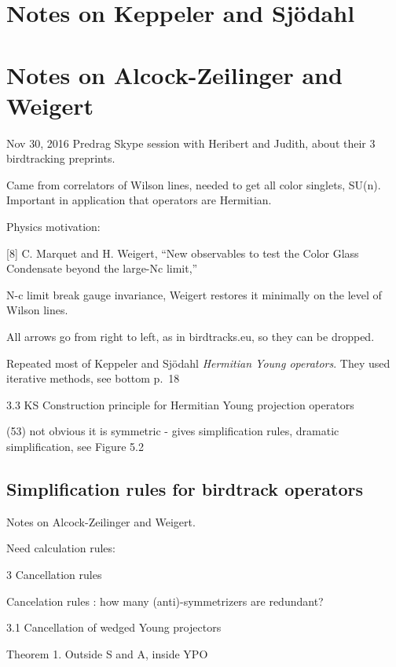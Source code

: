 \section{Notes on Keppeler and Sj{\"o}dahl}
\label{s-AlcZei16}



\section{Notes on Alcock-Zeilinger and Weigert}
\label{s-AlcZei16}

Nov 30, 2016 Predrag Skype session with
Heribert and Judith, about their 3 birdtracking preprints.

Came from correlators of Wilson lines, needed to get all color singlets, SU(n).
Important in application that operators are Hermitian.

Physics motivation:

[8] C. Marquet and H. Weigert, ``New observables to test the Color Glass Condensate beyond the large-Nc
limit,''

N-c limit break gauge invariance, Weigert restores it minimally on the level of
Wilson lines.


All arrows go from right to left, as in birdtracks.eu, so they can be dropped.

Repeated most of Keppeler and Sj{\"o}dahl
   {\em {Hermitian Young} operators}.
They used iterative methods,
see
 bottom p.~18

3.3 KS Construction principle for Hermitian Young projection operators

(53) not obvious it is symmetric -  gives simplification rules,
dramatic simplification, see Figure 5.2

\subsection{Simplification rules for birdtrack operators}
\label{s-AlcZei16-1}

Notes on Alcock-Zeilinger and Weigert.

Need calculation rules:

3 Cancellation rules

Cancelation rules : how many (anti)-symmetrizers are redundant?

3.1 Cancellation of wedged Young projectors

Theorem 1. Outside S and A, inside YPO


